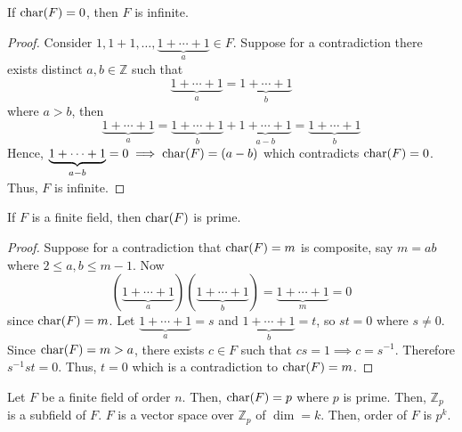 \begin{thmbox}
    \begin{theorem}
        If $ \operatorname{char}(F)=0 $, then $ F $ is infinite.
    \end{theorem}
\end{thmbox}

\begin{proof}
    Consider $ 1,1+1,\ldots,\underbrace{1+\cdots+1}_{a}\in F $.
    Suppose for a contradiction there exists distinct $ a,b\in\mathbb{Z} $
    such that
    \[ \underbrace{1+\cdots+1}_{a}=\underbrace{1+\cdots+1}_{b} \]
    where $ a>b $, then
    \[ \underbrace{1+\cdots+1}_{a}=\underbrace{1+\cdots+1}_{b}+
        \underbrace{1+\cdots+1}_{a-b}=\underbrace{1+\cdots+1}_{b} \]
    Hence, $ \underbrace{1+\cdots+1}_{a-b}=0\implies \operatorname{char}(F)=(a-b) $
    which contradicts $ \operatorname{char}(F)=0 $. Thus, $ F $ is infinite.
\end{proof}

\begin{thmbox}
    \begin{theorem}
        If $ F $ is a finite field, then $ \operatorname{char}(F) $ is prime.
    \end{theorem}
\end{thmbox}

\begin{proof}
    Suppose for a contradiction that $ \operatorname{char}(F)=m $ is composite,
    say $ m=ab $ where
    $ 2\leqslant a,b\leqslant m-1 $. Now
    \[ (\underbrace{1+\cdots+1}_{a})(\underbrace{1+\cdots+1}_{b})
        =\underbrace{1+\cdots+1}_{m}=0 \]
    since $ \operatorname{char}(F)=m $. Let $ \underbrace{1+\cdots+1}_{a}=s $
    and $ \underbrace{1+\cdots+1}_{b}=t $, so $ st=0 $ where $ s\neq 0 $.
    Since $ \operatorname{char}(F)=m>a $, there exists $ c\in F $ such that
    $ cs=1 \implies c=s^{-1} $. Therefore $ s^{-1}st=0 $. Thus,
    $ t=0 $ which is a contradiction to $ \operatorname{char}(F)=m $.
\end{proof}

 Let $ F $ be a finite field of order $ n $.
Then, $ \operatorname{char}(F)=p $ where $ p $ is prime. Then, $ \mathbb{Z}_p $ is a subfield
of $ F $. $ F $ is a vector space over $ \mathbb{Z}_p $ of $ \dim=k $.
Then, order of $ F $ is $ p^k $.
